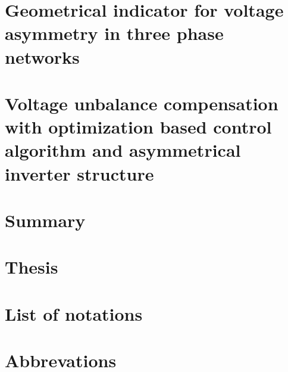 \documentclass[12pt, a4paper, oneside, table]{report}
\begin{document}
 \chapter{Geometrical indicator for voltage asymmetry in three phase networks}
 
 \chapter{Voltage unbalance compensation with optimization based control algorithm and asymmetrical inverter structure}
 

 \chapter{Summary}
 

 \chapter{Thesis}
 

 \chapter*{List of notations}
 

 \chapter*{Abbrevations}
 


 \newpage
 \pagestyle{plain}
 
 
\end{document}
